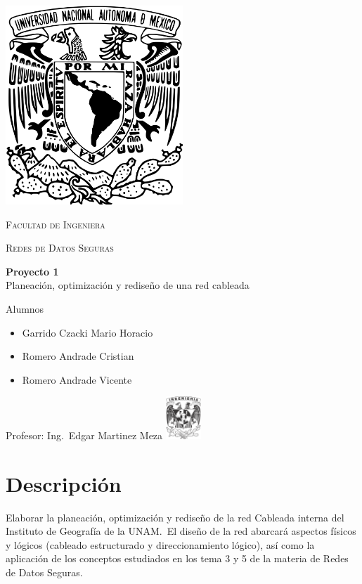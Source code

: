 \documentclass[letterpaper]{article}
\begin{document}
\begin{titlepage}
  \centering
  \includegraphics[width=0.5\textwidth]{unam_logo}\vfill{}
  {\scshape\Huge Facultad de Ingeniera\par}\vspace{0.5cm}
  {\scshape\Large Redes de Datos Seguras\par}\vfill
  {\huge \textbf{Proyecto 1}\\Planeación, optimización y
    rediseño de una red cableada}\vfill
  
  {\Large
    Alumnos\begin{itemize}
    \item Garrido Czacki Mario Horacio
    \item Romero Andrade Cristian
    \item Romero Andrade Vicente

    \end{itemize}
  }\vfill
  {\large Profesor: Ing.~Edgar Martinez Meza}\vfill
  \includegraphics[width=0.1\textwidth]{inge_logo}
  
  
\end{titlepage}

\tableofcontents{}\newpage

\section{Descripción}\label{sec:desc}

Elaborar la planeación, optimización y rediseño de la red Cableada interna del
Instituto de Geografía de la UNAM.\ El diseño de la red abarcará aspectos físicos
y lógicos (cableado estructurado y direccionamiento lógico), así como la
aplicación de los conceptos estudiados en los tema 3 y 5 de la materia de Redes
de Datos Seguras.
\end{document}
